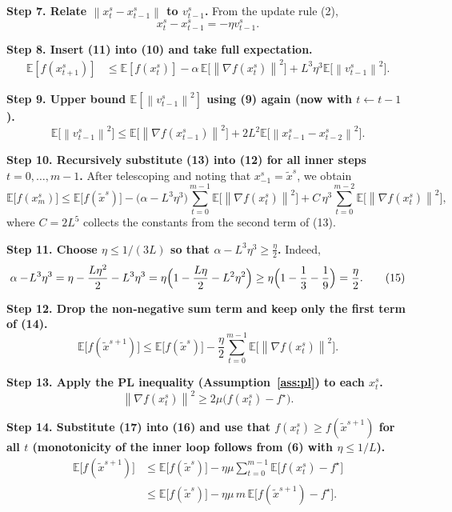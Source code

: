 \documentclass[11pt]{article}
\newcommand{\E}{\mathbb{E}}
\newcommand{\norm}[1]{\left\|#1\right\|}
\newcommand{\grad}{\nabla}
\begin{document}
\noindent\textbf{Step 7. Relate $\norm{x_{t}^{s}-x_{t-1}^{s}}$ to $v_{t-1}^{s}$.}  
From the update rule (2),
\[
x_{t}^{s}-x_{t-1}^{s}= -\eta v_{t-1}^{s}.
\tag{11}
\]  

\noindent\textbf{Step 8. Insert (11) into (10) and take full expectation.}  
\[
\begin{aligned}
\E[f(x_{t+1}^{s})]
&\le \E[f(x_{t}^{s})]-\alpha\,\E\!\bigl[\norm{\grad f(x_{t}^{s})}^{2}\bigr]
+L^{3}\eta^{3}\E\!\bigl[\norm{v_{t-1}^{s}}^{2}\bigr].
\end{aligned}
\tag{12}
\]  

\noindent\textbf{Step 9. Upper bound $\E[\norm{v_{t-1}^{s}}^{2}]$ using (9) again (now with $t\!\leftarrow\!t-1$).}  
\[
\E\!\bigl[\norm{v_{t-1}^{s}}^{2}\bigr]\le \E\!\bigl[\norm{\grad f(x_{t-1}^{s})}^{2}\bigr]+2L^{2}\E\!\bigl[\norm{x_{t-1}^{s}-x_{t-2}^{s}}^{2}\bigr].
\tag{13}
\]  

\noindent\textbf{Step 10. Recursively substitute (13) into (12) for all inner steps $t=0,\dots,m-1$.}  
After telescoping and noting that $x_{-1}^{s}=\tilde{x}^{s}$, we obtain
\[
\E\!\bigl[f(x_{m}^{s})\bigr]\le \E\!\bigl[f(\tilde{x}^{s})\bigr]
-\bigl(\alpha- L^{3}\eta^{3}\bigr)\sum_{t=0}^{m-1}\E\!\bigl[\norm{\grad f(x_{t}^{s})}^{2}\bigr]
+ C\,\eta^{3}\sum_{t=0}^{m-2}\E\!\bigl[\norm{\grad f(x_{t}^{s})}^{2}\bigr],
\tag{14}
\]  
where $C=2L^{5}$ collects the constants from the second term of (13).  

\noindent\textbf{Step 11. Choose $\eta\le 1/(3L)$ so that $\alpha-\!L^{3}\eta^{3}\ge \tfrac{\eta}{2}$.}  
Indeed,
\[
\alpha-\!L^{3}\eta^{3}
 =\eta-\frac{L\eta^{2}}{2}-L^{3}\eta^{3}
 =\eta\Bigl(1-\frac{L\eta}{2}-L^{2}\eta^{2}\Bigr)
 \ge\eta\Bigl(1-\frac13-\frac19\Bigr)=\frac{\eta}{2}.
\tag{15}
\]  

\noindent\textbf{Step 12. Drop the non‑negative sum term and keep only the first term of (14).}  
\[
\E\!\bigl[f(\tilde{x}^{s+1})\bigr]
\le \E\!\bigl[f(\tilde{x}^{s})\bigr]-\frac{\eta}{2}\sum_{t=0}^{m-1}\E\!\bigl[\norm{\grad f(x_{t}^{s})}^{2}\bigr].
\tag{16}
\]  

\noindent\textbf{Step 13. Apply the PL inequality (Assumption~\ref{ass:pl}) to each $x_{t}^{s}$.}  
\[
\norm{\grad f(x_{t}^{s})}^{2}\ge 2\mu\bigl(f(x_{t}^{s})-f^{\star}\bigr).
\tag{17}
\]  

\noindent\textbf{Step 14. Substitute (17) into (16) and use that $f(x_{t}^{s})\ge f(\tilde{x}^{s+1})$ for all $t$ (monotonicity of the inner loop follows from (6) with $\eta\le 1/L$).}  
\[
\begin{aligned}
\E\!\bigl[f(\tilde{x}^{s+1})\bigr]
&\le \E\!\bigl[f(\tilde{x}^{s})\bigr]-\eta\mu\sum_{t=0}^{m-1}\E\!\bigl[f(x_{t}^{s})-f^{\star}\bigr]\\
&\le \E\!\bigl[f(\tilde{x}^{s})\bigr]-\eta\mu\,m\,\E\!\bigl[f(\tilde{x}^{s+1})-f^{\star}\bigr].
\end{aligned}
\tag{18}
\]  
\end{document}
